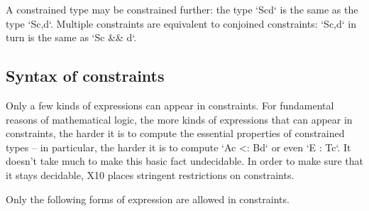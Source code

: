 A constrained type may be constrained further: the type \xcd`S{c}{d}`
is the same as the type \xcd`S{c,d}`.  Multiple constraints are equivalent to
conjoined constraints: \xcd`S{c,d}` in turn is the same as \xcd`S{c && d}`.

\subsection{Syntax of constraints}
\label{PermittedConstraints}



Only a few kinds of expressions can appear in constraints.  For fundamental
reasons of mathematical logic, the more kinds of expressions that can appear
in constraints, the harder it is to compute the essential properties of
constrained types -- in particular, the harder it is to compute 
\xcd`A{c} <: B{d}` or even \xcd`E : T{c}`.  It doesn't take much to make this
basic fact undecidable. 
In order to make sure that it stays decidable, X10 places stringent restrictions on
constraints.  

Only the following forms of expression are allowed in constraints.  

